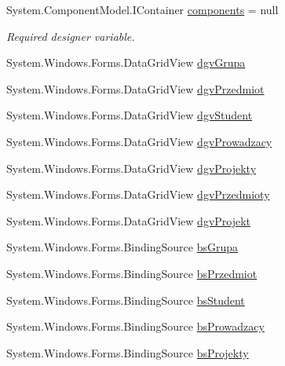 \begin{DoxyCompactItemize}
\item 
System.\+Component\+Model.\+I\+Container \hyperlink{class_dziennik_ocen_1_1_form_admin_add4f712ca83ab265bf5dc023ae8b7a49}{components} = null
\begin{DoxyCompactList}\small\item\em Required designer variable. \end{DoxyCompactList}\item 
System.\+Windows.\+Forms.\+Data\+Grid\+View \hyperlink{class_dziennik_ocen_1_1_form_admin_a2e704158d9e4b76e3d75c77c6a41c577}{dgv\+Grupa}
\item 
System.\+Windows.\+Forms.\+Data\+Grid\+View \hyperlink{class_dziennik_ocen_1_1_form_admin_a9120bd1ad60f426475791e60ccdd0204}{dgv\+Przedmiot}
\item 
System.\+Windows.\+Forms.\+Data\+Grid\+View \hyperlink{class_dziennik_ocen_1_1_form_admin_a0f7bd114b47cd8b11a067b5f0dbe9f3f}{dgv\+Student}
\item 
System.\+Windows.\+Forms.\+Data\+Grid\+View \hyperlink{class_dziennik_ocen_1_1_form_admin_a10132ded0fc33de4056568a632e598c7}{dgv\+Prowadzacy}
\item 
System.\+Windows.\+Forms.\+Data\+Grid\+View \hyperlink{class_dziennik_ocen_1_1_form_admin_a54f958ca831b5544020cfdfc7e0ece9a}{dgv\+Projekty}
\item 
System.\+Windows.\+Forms.\+Data\+Grid\+View \hyperlink{class_dziennik_ocen_1_1_form_admin_aecd123ff4d179ae6392fed78530377f0}{dgv\+Przedmioty}
\item 
System.\+Windows.\+Forms.\+Data\+Grid\+View \hyperlink{class_dziennik_ocen_1_1_form_admin_ade721ef47de208cef1144d075432f31f}{dgv\+Projekt}
\item 
System.\+Windows.\+Forms.\+Binding\+Source \hyperlink{class_dziennik_ocen_1_1_form_admin_a05c33963ce3177b48999725fc766ed75}{bs\+Grupa}
\item 
System.\+Windows.\+Forms.\+Binding\+Source \hyperlink{class_dziennik_ocen_1_1_form_admin_ab0adea8acde680ff8e2ad0329b526a97}{bs\+Przedmiot}
\item 
System.\+Windows.\+Forms.\+Binding\+Source \hyperlink{class_dziennik_ocen_1_1_form_admin_a1c7f6c81ca582f263c66fc2be3928661}{bs\+Student}
\item 
System.\+Windows.\+Forms.\+Binding\+Source \hyperlink{class_dziennik_ocen_1_1_form_admin_a32118b2507f71e59c520449711857dba}{bs\+Prowadzacy}
\item 
System.\+Windows.\+Forms.\+Binding\+Source \hyperlink{class_dziennik_ocen_1_1_form_admin_af48204622d8aca29dceb4935b9e272c1}{bs\+Projekty}

\end{DoxyCompactItemize}
